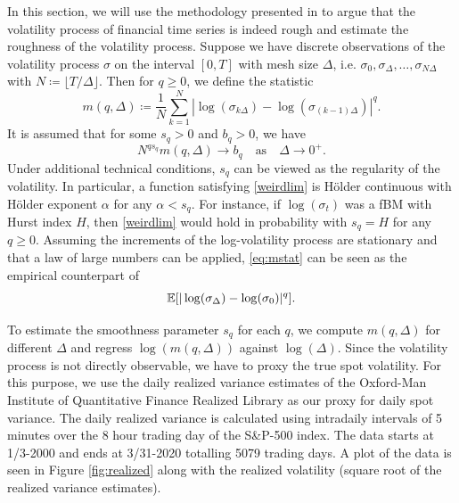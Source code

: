 In this section, we will use the methodology presented in \cite{volisrough} to argue that the volatility process of financial time series is indeed rough and estimate the roughness of the volatility process. Suppose we have discrete observations of the volatility process $\sigma$ on the interval $[0,T]$ with mesh size $\Delta$, i.e. $\sigma_{0},\sigma_{\Delta},\dots,\sigma_{N\Delta}$ with $N\coloneqq \lfloor T/\Delta\rfloor$. Then for $q\geq 0$, we define the statistic
\begin{equation}\label{eq:mstat}
    m(q,\Delta)\coloneqq \frac{1}{N}\sum_{k=1}^{N}|\log(\sigma_{k\Delta})-\log(\sigma_{(k-1)\Delta})|^{q}.
\end{equation}
It is assumed that for some $s_{q}>0$ and $b_{q}>0$, we have
\begin{equation}\label{weirdlim}
    N^{qs_{q}}m(q,\Delta)\to b_{q}\quad \textrm{as}\quad \Delta\to 0^{+}.
\end{equation}
Under additional technical conditions, $s_{q}$ can be viewed as the regularity of the volatility. In particular, a function satisfying \eqref{weirdlim} is Hölder continuous with Hölder exponent $\alpha$ for any $\alpha <s_{q}$. For instance, if $\log(\sigma_{t})$ was a fBM with Hurst index $H$, then \eqref{weirdlim} would hold in probability with $s_{q}=H$ for any $q\geq 0$. Assuming the increments of the log-volatility process are stationary and that a law of large numbers can be applied, \eqref{eq:mstat} can be seen as the empirical counterpart of 
\begin{equation}
    \E\left[|\log(\sigma_{\Delta})-\log(\sigma_{0})|^{q}\right].
\end{equation}

To estimate the smoothness parameter $s_{q}$ for each $q$, we compute $m(q,\Delta)$ for different $\Delta$ and regress $\log(m(q,\Delta))$ against $\log(\Delta)$. Since the volatility process is not directly observable, we have to proxy the true spot volatility. For this purpose, we use the daily realized variance estimates of the Oxford-Man Institute of Quantitative Finance Realized Library as our proxy for daily spot variance. The daily realized variance is calculated using intradaily intervals of 5 minutes over the 8 hour trading day of the S\&P-500 index. The data starts at 1/3-2000 and ends at 3/31-2020 totalling 5079 trading days. A plot of the data is seen in Figure \ref{fig:realized} along with the realized volatility (square root of the realized variance estimates).

